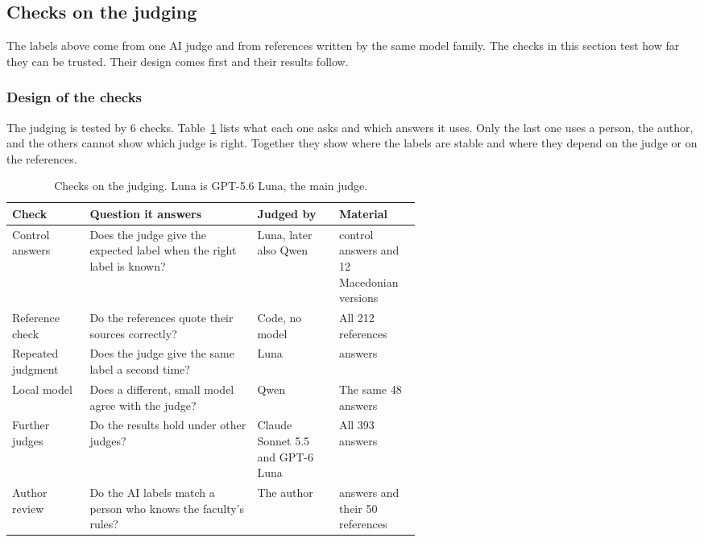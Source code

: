 \subsection{Checks on the judging}
\label{sec:judge-checks}

The labels above come from one AI judge and from references written by the same model family. The checks in this section test how far they can be trusted. Their design comes first and their results follow.

\subsubsection{Design of the checks}

The judging is tested by 6 checks. Table~\ref{tab:check-design} lists what each one asks and which answers it uses. Only the last one uses a person, the author, and the others cannot show which judge is right. Together they show where the labels are stable and where they depend on the judge or on the references.

\begin{table}[htbp]
\centering
\caption[Checks on the judging]{Checks on the judging. Luna is GPT-5.6 Luna, the main judge.}
\label{tab:check-design}
\small
\begin{tabularx}{\linewidth}{@{}>{\raggedright\arraybackslash}p{0.19\linewidth}>{\raggedright\arraybackslash}X>{\raggedright\arraybackslash}p{0.2\linewidth}>{\raggedright\arraybackslash}p{0.2\linewidth}@{}}
\toprule
Check & Question it answers & Judged by & Material \\
\midrule
Control answers & Does the judge give the expected label when the right label is known? & Luna, later also Qwen & 18 control answers and 12 Macedonian versions \\
Reference check & Do the references quote their sources correctly? & Code, no model & All 212 references \\
Repeated judgment & Does the judge give the same label a second time? & Luna & 48 answers \\
Local model & Does a different, small model agree with the judge? & Qwen & The same 48 answers \\
Further judges & Do the results hold under other judges? & Claude Sonnet 5.5 and GPT-6 Luna & All 393 answers \\
Author review & Do the AI labels match a person who knows the faculty's rules? & The author & 50 answers and their 50 references \\
\bottomrule
\end{tabularx}
\end{table}

